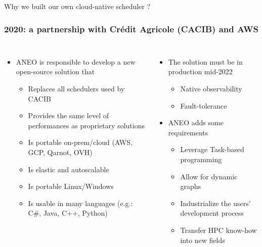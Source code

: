 \documentclass[10pt,aspectratio=1609]{beamer}
\begin{document}
\begin{section}{Why we built our own cloud-native scheduler ?}
  \begin{frame}
    \frametitle{2020: a partnership with Crédit Agricole (CACIB) and AWS}
    \begin{columns}
      \begin{itemize}
        \item ANEO is responsible to develop a new open-source solution that
        \begin{itemize}
          \item Replaces all schedulers used by CACIB
          \item Provides the same level of performances as proprietary solutions
          \item Is portable on-prem/cloud (AWS, GCP, Qarnot, OVH)
          \item Is elastic and autoscalable
          \item Is portable Linux/Windows
          \item Is usable in many languages (e.g.: C\#, Java, C++, Python)
        \end{itemize}
      \end{itemize}
      \begin{itemize}
        \item The solution must be in production mid-2022
        \begin{itemize}
          \item Native observability
          \item Fault-tolerance
        \end{itemize}
        \item ANEO adds some requirements
        \begin{itemize}
          \item Leverage Task-based programming
          \item Allow for dynamic graphs
          \item Industrialize the users' development process
          \item Transfer HPC know-how into new fields
        \end{itemize}
      \end{itemize}
    \end{columns}
  \end{frame}
  

\end{section}
\end{document}
